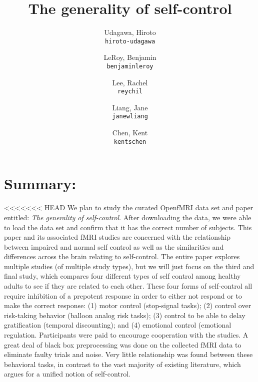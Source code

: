 \documentclass[11pt]{article}
\title{The generality of self-control}
\author{
  Udagawa, Hiroto\\
  \texttt{hiroto-udagawa}
  \and
  LeRoy, Benjamin\\
  \texttt{benjaminleroy}
  \and
  Lee, Rachel\\
  \texttt{reychil}
  \and
  Liang, Jane\\
  \texttt{janewliang}
  \and
  Chen, Kent\\
  \texttt{kentschen}
}
\begin{document}
\maketitle

\section{Summary:}
<<<<<<< HEAD
We plan to study the curated OpenfMRI data set and paper entitled: \textit{The generality of self-control}. After downloading the data, we were able to load the data set and confirm that it has the correct number of subjects. This paper and its associated fMRI studies are concerned with the relationship between impaired and normal self control as well as the similarities and differences across the brain relating to self-control. The entire paper explores multiple studies (of multiple study types), but we will just focus on the third and final study, which compares four different types of self control among healthy adults to see if they are related to each other. These four forms of self-control all require inhibition of a prepotent response in order to either not respond or to make the correct response: (1) motor control (stop-signal tasks); (2) control over risk-taking behavior (balloon analog risk tasks); (3) control to be able to delay gratification (temporal discounting); and (4) emotional control (emotional regulation. Participants were paid to encourage cooperation with the studies. A great deal of black box preprocessing was done on the collected fMRI data to eliminate faulty trials and noise. Very little relationship was found between these behavioral tasks, in contrast to the vast majority of existing literature, which argues for a unified notion of self-control.
\end{document}
